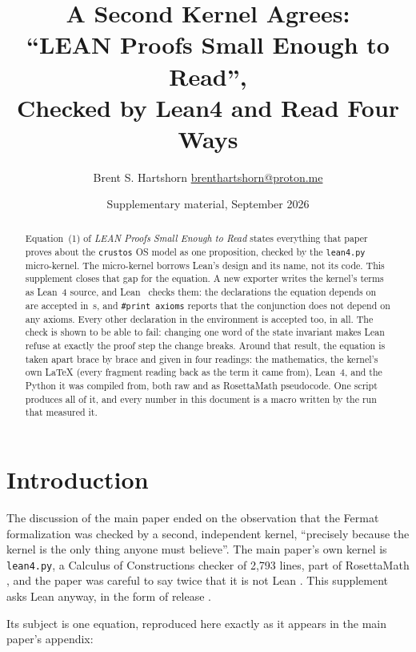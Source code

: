 \documentclass[11pt]{article}
\title{A Second Kernel Agrees:\\
``LEAN Proofs Small Enough to Read'',\\
Checked by Lean4 and Read Four Ways}
\author{Brent S. Hartshorn \orcidlink{0009-0004-2853-655X} \small \url{brenthartshorn@proton.me}}
\date{Supplementary material, September 2026}
\newcommand{\code}[1]{\texttt{#1}}
\begin{document}
\maketitle

\begin{abstract}
Equation~(1) of \emph{LEAN Proofs Small Enough to Read} \cite{hartshorn2026lean}
states everything that paper proves about the \code{crustos} OS model as one
proposition, checked by the \code{lean4.py} micro-kernel. The micro-kernel
borrows Lean's design and its name, not its code. This supplement closes that
gap for the equation. A new exporter writes the kernel's terms as Lean~4
source, and Lean~\leanVersion{} checks them: the \leanDecls{} declarations the
equation depends on are accepted in \leanSeconds\,s, and
\code{\#print axioms} reports that the conjunction does not depend on any
axioms. Every other declaration in the environment is accepted too,
\leanAllDecls{} in all. The check is shown to be able to fail: changing one
word of the state invariant makes Lean refuse at exactly the proof step the
change breaks. Around that result, the equation is taken apart brace by brace
and given in four readings: the mathematics, the kernel's own \LaTeX{} (every
fragment reading back as the term it came from), Lean~4, and the Python it was
compiled from, both raw and as RosettaMath pseudocode. One script produces all
of it, and every number in this document is a macro written by the run that
measured it.
\end{abstract}

\section{Introduction}
\label{sec:intro}

The discussion of the main paper \cite{hartshorn2026lean} ended on the
observation that the Fermat formalization \cite{anthropic2026flt} was checked by a second,
independent kernel, ``precisely because the kernel is the only thing anyone
must believe''. The main paper's own kernel is \code{lean4.py}, a Calculus of
Constructions \cite{coquand1988} checker of 2{,}793 lines, part of RosettaMath \cite{hartshorn2026rosetta}, and the paper was careful to say
twice that it is not Lean \cite{demoura2021}. This supplement asks Lean anyway, in the form of release \leanVersion{} \cite{lean420}.

Its subject is one equation, reproduced here exactly as it appears in the main
paper's appendix:

\newcommand{\ctx}{\code{Ctx}}
\newcommand{\cur}[1]{#1.\code{cur}}
\newcommand{\nth}[1]{#1.\code{n}}
\newcommand{\hld}{\code{Holds}}
\end{document}
